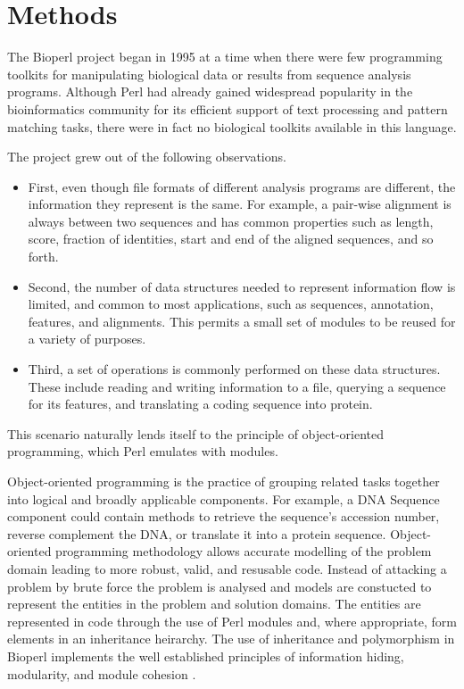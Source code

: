 \documentclass[12pt]{article}
\begin{document}
\section{Methods}

The Bioperl project began in 1995 \cite{chervitz-bits} at a time when
there were few programming toolkits for manipulating biological data
or results from sequence analysis programs.  Although Perl had already
gained widespread popularity in the bioinformatics community for its
efficient support of text processing and pattern matching tasks, there
were in fact no biological toolkits available in this language.

The project grew out of the following observations.  
\begin{itemize}

\item First, even though file formats of different analysis programs
are different, the information they represent is the same.  For
example, a pair-wise alignment is always between two sequences and has
common properties such as length, score, fraction of identities, start
and end of the aligned sequences, and so forth.

\item Second, the number of data structures needed to represent
information flow is limited, and common to most applications, such as
sequences, annotation, features, and alignments.  This permits a 
small set of modules to be reused for a variety of purposes.

\item Third, a set of operations is commonly performed on these data
structures.  These include reading and writing information to a file,
querying a sequence for its features, and translating a coding
sequence into protein.

\end{itemize}

This scenario naturally lends itself to the principle of
object-oriented programming, which Perl emulates with modules.

Object-oriented programming is the practice of grouping related tasks
together into logical and broadly applicable components.  For example,
a DNA Sequence component could contain methods to retrieve the
sequence's accession number, reverse complement the DNA, or translate
it into a protein sequence.  Object-oriented programming methodology
allows accurate modelling of the problem domain leading to more
robust, valid, and resusable code. Instead of attacking a problem by
brute force the problem is analysed and models are constucted to
represent the entities in the problem and solution domains. The
entities are represented in code through the use of Perl modules and,
where appropriate, form elements in an inheritance heirarchy.  The use
of inheritance and polymorphism in Bioperl implements the well
established principles of information hiding, modularity, and module
cohesion \cite{tremblay}.
\end{document}
